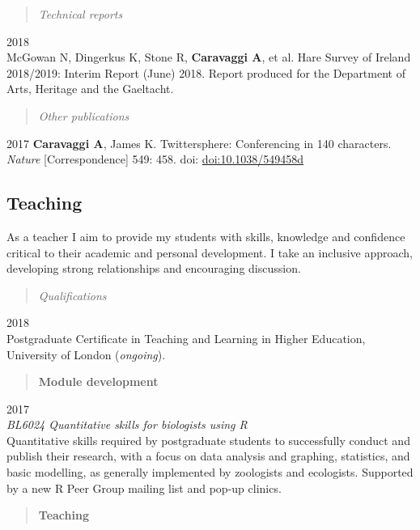 \documentclass[]{article}
\begin{document}
\begin{quote}
\emph{Technical reports}
\end{quote}

2018\\
McGowan N, Dingerkus K, Stone R, \textbf{Caravaggi A}, et al. Hare
Survey of Ireland 2018/2019: Interim Report (June) 2018. Report produced
for the Department of Arts, Heritage and the Gaeltacht.

\begin{quote}
\emph{Other publications}
\end{quote}

2017 \textbf{Caravaggi A}, James K. Twittersphere: Conferencing in 140
characters. \emph{Nature} {[}Correspondence{]} 549: 458. doi:
\href{http://www.nature.com/nature/journal/v549/n7673/full/549458d.html}{doi:10.1038/549458d}

\subsection{Teaching}\label{teaching}

As a teacher I aim to provide my students with skills, knowledge and
confidence critical to their academic and personal development. I take
an inclusive approach, developing strong relationships and encouraging
discussion.

\begin{quote}
\emph{Qualifications}
\end{quote}

2018\\
Postgraduate Certificate in Teaching and Learning in Higher Education,
University of London (\emph{ongoing}).

\begin{quote}
\textbf{Module development}
\end{quote}

2017\\
\emph{BL6024 Quantitative skills for biologists using R}\\
Quantitative skills required by postgraduate students to successfully
conduct and publish their research, with a focus on data analysis and
graphing, statistics, and basic modelling, as generally implemented by
zoologists and ecologists. Supported by a new R Peer Group mailing list
and pop-up clinics.

\begin{quote}
\textbf{Teaching}
\end{quote}
\end{document}
